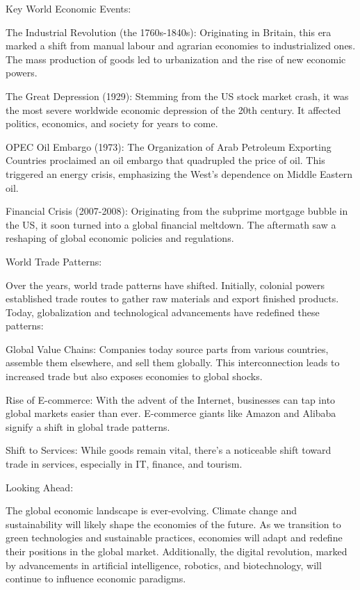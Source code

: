 Key World Economic Events:

The Industrial Revolution (the 1760s-1840s): Originating in Britain, this era marked a shift from manual labour and agrarian economies to industrialized ones. The mass production of goods led to urbanization and the rise of new economic powers.

The Great Depression (1929): Stemming from the US stock market crash, it was the most severe worldwide economic depression of the 20th century. It affected politics, economics, and society for years to come.

OPEC Oil Embargo (1973): The Organization of Arab Petroleum Exporting Countries proclaimed an oil embargo that quadrupled the price of oil. This triggered an energy crisis, emphasizing the West's dependence on Middle Eastern oil.

Financial Crisis (2007-2008): Originating from the subprime mortgage bubble in the US, it soon turned into a global financial meltdown. The aftermath saw a reshaping of global economic policies and regulations.

World Trade Patterns:

Over the years, world trade patterns have shifted. Initially, colonial powers established trade routes to gather raw materials and export finished products. Today, globalization and technological advancements have redefined these patterns:

Global Value Chains: Companies today source parts from various countries, assemble them elsewhere, and sell them globally. This interconnection leads to increased trade but also exposes economies to global shocks.

Rise of E-commerce: With the advent of the Internet, businesses can tap into global markets easier than ever. E-commerce giants like Amazon and Alibaba signify a shift in global trade patterns.

Shift to Services: While goods remain vital, there's a noticeable shift toward trade in services, especially in IT, finance, and tourism.

Looking Ahead:

The global economic landscape is ever-evolving. Climate change and sustainability will likely shape the economies of the future. As we transition to green technologies and sustainable practices, economies will adapt and redefine their positions in the global market. Additionally, the digital revolution, marked by advancements in artificial intelligence, robotics, and biotechnology, will continue to influence economic paradigms.

